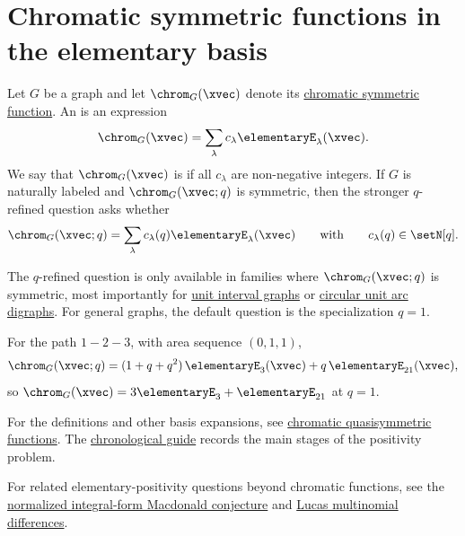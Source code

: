
\section[chromaticEexpansion]{Chromatic symmetric functions in the elementary basis}

Let $G$ be a graph and let $\chrom_G(\xvec)$ denote its
\hyperref[chromaticQuasisymmetricDefinition]{chromatic symmetric function}.
An  is an expression
\label{chromaticEExpansionDefinition}
\[
\chrom_G(\xvec) = \sum_{\lambda} c_\lambda \elementaryE_\lambda(\xvec).
\]
We say that $\chrom_G(\xvec)$ is
\label{chromaticEPositive} if all
$c_\lambda$ are non-negative integers. If $G$ is naturally labeled and
$\chrom_G(\xvec;q)$ is symmetric, then the stronger $q$-refined question asks
whether
\[
\chrom_G(\xvec;q) = \sum_{\lambda} c_\lambda(q) \elementaryE_\lambda(\xvec)
\qquad\text{with}\qquad c_\lambda(q) \in \setN[q].
\]

The $q$-refined question is only available in families where
$\chrom_G(\xvec;q)$ is symmetric, most importantly for
\hyperref[unitIntervalGraph]{unit interval graphs} or
\hyperref[circularUnitArcDigraph]{circular unit arc digraphs}.
For general graphs, the default question is the specialization $q=1$.

\begin{example}
For the path $1-2-3$, with area sequence $(0,1,1)$,
\[
\chrom_G(\xvec;q)=(1+q+q^2)\,\elementaryE_3(\xvec)+q\,\elementaryE_{21}(\xvec),
\]
so $\chrom_G(\xvec)=3\elementaryE_3+\elementaryE_{21}$ at $q=1$.
\end{example}

For the definitions and other basis expansions, see
\hyperref[chromaticQuasisymmetric]{chromatic quasisymmetric functions}.
The \hyperref[chromaticEExpansionChronology]{chronological guide} records
the main stages of the positivity problem.

For related elementary-positivity questions beyond chromatic functions,
see the \hyperref[macdonaldJElementaryPositivity]{normalized integral-form
Macdonald conjecture} and
\hyperref[lucasSymmetricPositivity]{Lucas multinomial differences}.

